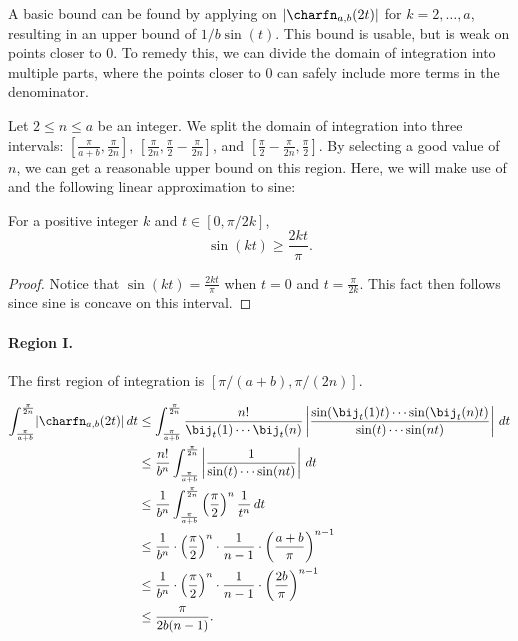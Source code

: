 A basic bound can be found by applying  on $\lvert\charfn_{a,b}(2t)\rvert$ for $k=2,\dots,a$, resulting in an upper bound of $1/b\sin(t)$. This bound is usable, but is weak on points closer to 0. To remedy this, we can divide the domain of integration into multiple parts, where the points closer to 0 can safely include more terms in the denominator.

Let $2\le n\le a$ be an integer. We split the domain of integration into three intervals: $[\frac{\pi}{a+b}, \frac{\pi}{2n}]$, $[\frac{\pi}{2n},  \frac{\pi}{2}- \frac{\pi}{2n}]$, and $[\frac{\pi}{2}-\frac{\pi}{2n},\frac{\pi}{2}]$. By selecting a good value of $n$, we can get a reasonable upper bound on this region.
Here, we will make use of  and the following linear approximation to sine: 

\begin{fact}
    \label{fact:linearlowerbound}
    For a positive integer $k$ and $t\in [0, \pi/2k]$,
    \[\sin(kt)\ge \frac{2kt}{\pi }. \]
\end{fact}

\begin{proof}
    Notice that $\sin(kt)=\frac{2kt}{\pi}$ when $t=0$ and $t=\frac{\pi}{2k}$. This fact then follows since sine is concave on this interval.     
\end{proof}

\paragraph{Region I.}

The first region of integration is $[\pi/(a+b),\pi/(2n)]$.

\begin{align*}
    \int_{\frac{\pi}{a+b}}^{\frac{\pi}{2n}} \lvert\charfn_{a,b}(2t)\rvert\,dt &\le  \int_{\frac{\pi}{a+b}}^{\frac{\pi}{2n}} \frac{n!}{\bij_t(1)\cdots \bij_t(n)} \left\lvert \frac{\sin(\bij_t(1)t)\cdots \sin(\bij_t(n)t)}{\sin(t)\cdots \sin(nt)}\right\rvert \, dt \\
    &\le \frac{n!}{b^n}\int_{\frac{\pi}{a+b}}^{\frac{\pi}{2n}} \left\lvert\frac{1}{\sin(t)\cdots \sin(nt)} \right\rvert\,dt \\
    &\le \frac{1}{b^n}\int_{\frac{\pi}{a+b}}^{\frac{\pi}{2n}} \left(\frac{\pi}{2}\right)^n \frac{1}{t^n}\,dt\\
    &\le \frac{1}{b^n}\cdot \left(\frac{\pi}{2}\right)^n \cdot\frac{1}{n-1}\cdot \left(\frac{a+b}{\pi}\right)^{n-1}\\
    &\le \frac{1}{b^n}\cdot \left(\frac{\pi}{2}\right)^n \cdot\frac{1}{n-1}\cdot \left(\frac{2b}{\pi}\right)^{n-1}\\
    &\le \frac{\pi}{2b(n-1)}.
\end{align*}

